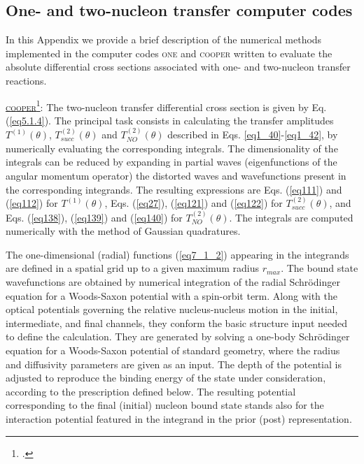 \begin{subappendices}
\section{One- and two-nucleon transfer computer codes}\label{C8AppD}
In this Appendix we provide a brief description of the numerical methods implemented in the computer codes \textsc{one} and \textsc{cooper} written to evaluate the absolute differential cross sections associated with one- and two-nucleon transfer reactions.


 
 
 
 \underline{\textsc{cooper}}\footnote{\cite{Potel:12c}.}: The two-nucleon transfer differential cross section is given by Eq. (\ref{eq5.1.4}).  The principal task consists in calculating the transfer amplitudes $T^{(1)}(\theta)$, $T^{(2)}_{succ}(\theta)$ and $T^{(2)}_{NO}(\theta)$ described in Eqs. \ref{eq1_40}-\ref{eq1_42}, by numerically evaluating the corresponding integrals.  The dimensionality of the integrals  can be reduced by expanding in partial waves (eigenfunctions of the angular momentum operator) the distorted waves and wavefunctions present in the corresponding integrands. The resulting expressions are Eqs. (\ref{eq111}) and (\ref{eq112}) for $T^{(1)}(\theta)$, Eqs. (\ref{eq27}), (\ref{eq121}) and (\ref{eq122}) for $T^{(2)}_{succ}(\theta)$, and Eqs. (\ref{eq138}), (\ref{eq139}) and (\ref{eq140}) for $T^{(2)}_{NO}(\theta)$. The integrals are computed numerically with the method of Gaussian quadratures. 


The one-dimensional (radial) functions (\ref{eq7_1_2}) appearing in the integrands are defined in a spatial grid up to a given maximum radius $r_{max}$. The bound state  wavefunctions are obtained by numerical integration of the radial Schr\"odinger equation for a Woods-Saxon potential with a spin-orbit term. Along with the optical potentials governing the relative nucleus-nucleus motion in the initial, intermediate, and final channels, they conform the basic structure input needed to define the calculation. They are generated by solving a one-body Schr\"odinger equation for a Woods-Saxon potential of standard geometry, where the radius and diffusivity parameters are given as an input. The depth of the potential is adjusted to reproduce the binding energy of the state under consideration, according to the prescription defined below. The resulting potential corresponding to the final (initial) nucleon bound state stands also for the interaction potential featured in the integrand in the prior (post) representation. 


\end{subappendices}

